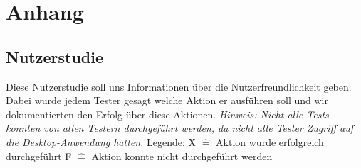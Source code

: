 \documentclass[a4paper]{scrreprt}
\begin{document}
\chapter{Anhang}
\section{Nutzerstudie}
Diese Nutzerstudie soll uns Informationen über die Nutzerfreundlichkeit geben. Dabei wurde jedem Tester gesagt welche Aktion er ausführen soll und wir dokumentierten den Erfolg über diese Aktionen.
\textit{Hinweis: Nicht alle Tests konnten von allen Testern durchgeführt werden, da nicht alle Tester Zugriff auf die Desktop-Anwendung hatten.} \newline
Legende: \newline
X $\widehat{=}$ Aktion wurde erfolgreich durchgeführt \newline
F $\widehat{=}$ Aktion konnte nicht durchgeführt werden \newline
\end{document}
